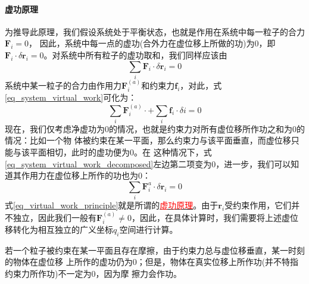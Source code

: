 \paragraph*{虚功原理}
为推导此原理，我们假设系统处于平衡状态，也就是作用在系统中每一粒子的合力$\bm{F}_i = 0$，
因此，系统中每一点的虚功(合外力在虚位移上所做的功)为0，即$\bm{F}_i \cdot \delta \bm{r}_i =0$。对系统中所有粒子的虚功取和，我们同样应该由
\begin{equation}
	\sum_i \bm{F}_i \cdot \delta \bm{r}_i  = 0 \label{eq_system_virtual_work}
\end{equation} 
系统中某一粒子的合力由作用力$\bm{F}^{(a)}_i$和约束力$\bm{f}_i$，对此，式\eqref{eq_system_virtual_work}可化为：
\begin{equation}
	\sum_i \bm{F}^{(a)}_i \cdot + \sum_i \bm{f}_i \cdot \delta i = 0
                                  \label{eq_system_virtual_work_decomposed}
\end{equation} 
现在，我们仅考虑净虚功为0的情况，也就是约束力对所有虚位移所作功之和为0的情况：比如一个物
体被约束在某一平面，那么约束力与该平面垂直，而虚位移只能与该平面相切，此时的虚功便为0。在
这种情况下，式\eqref{eq_system_virtual_work_decomposed}左边第二项变为0，进一步，我们可以知
道其作用力在虚位移上所作的功也为0：
\begin{equation}
	\sum_i \bm{F}^a_i \cdot \delta \bm{r}_i = 0	\label{eq_virtual_work_principle}
\end{equation} 
式\eqref{eq_virtual_work_principle}就是所谓的\underline{\textcolor{red}{虚功原理}}。由于$\bm{r}_i$受约束作用，它们并不独立，因此我们一般有$\bm{F}^{(a)}_i \neq 0$，因此，在具体计算时，我们需要将上述虚位移转化为相互独立的广义坐标$q_i$空间进行计算。
\begin{note}
	若一个粒子被约束在某一平面且存在摩擦，由于约束力总与虚位移垂直，某一时刻的物体在虚位移
    上所作的虚功仍为0；但是，物体在真实位移上所作功(并不特指约束力所作功)不一定为0，因为摩
    擦力会作功。
\end{note}

